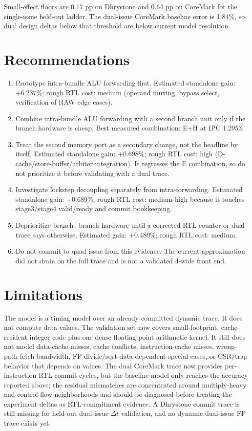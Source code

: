 \documentclass[10pt]{article}
\begin{document}
Small-effect floors are 0.17 pp on Dhrystone and 0.64 pp on CoreMark for the
single-issue held-out ladder. The dual-issue CoreMark baseline error is 1.84\%,
so dual design deltas below that threshold are below current model resolution.

\section*{Recommendations}

\begin{enumerate}
\item Prototype intra-bundle ALU forwarding first. Estimated standalone gain:
+6.237\%; rough RTL cost: medium
(operand muxing, bypass select, verification of RAW edge cases).
\item Combine intra-bundle ALU forwarding with a second branch unit only if the
branch hardware is cheap. Best measured combination: E+H at IPC
1.2953.
\item Treat the second memory port as a secondary change, not the headline by
itself. Estimated standalone gain: +0.698\%;
rough RTL cost: high (D-cache/store-buffer/arbiter integration). It regresses
the E combination, so do not prioritize it before validating with a dual trace.
\item Investigate lockstep decoupling separately from intra-forwarding.
Estimated standalone gain: +0.689\%;
rough RTL cost: medium-high because it touches stage3/stage4 valid/ready and
commit bookkeeping.
\item Deprioritize branch+branch hardware until a corrected RTL counter or dual
trace says otherwise. Estimated gain: +0.480\%;
rough RTL cost: medium.
\item Do not commit to quad issue from this evidence. The current approximation
did not drain on the full trace and is not a validated 4-wide front end.
\end{enumerate}

\section*{Limitations}

The model is a timing model over an already committed dynamic trace. It does not
compute data values. The validation set now covers small-footprint,
cache-resident integer code plus one dense floating-point arithmetic kernel. It
still does not model data-cache misses, cache conflicts, instruction-cache
misses, wrong-path fetch bandwidth, FP divide/sqrt data-dependent special cases,
or CSR/trap behavior that depends on values. The dual CoreMark trace now
provides per-instruction RTL commit cycles, but the baseline model only reaches
the accuracy reported above; the residual mismatches are concentrated around
multiply-heavy and control-flow neighborhoods and should be diagnosed before
treating the experiment deltas as RTL-commitment evidence. A Dhrystone commit
trace is still missing for held-out dual-issue $\Delta t$ validation, and no
dynamic dual-issue FP trace exists yet.
\end{document}

